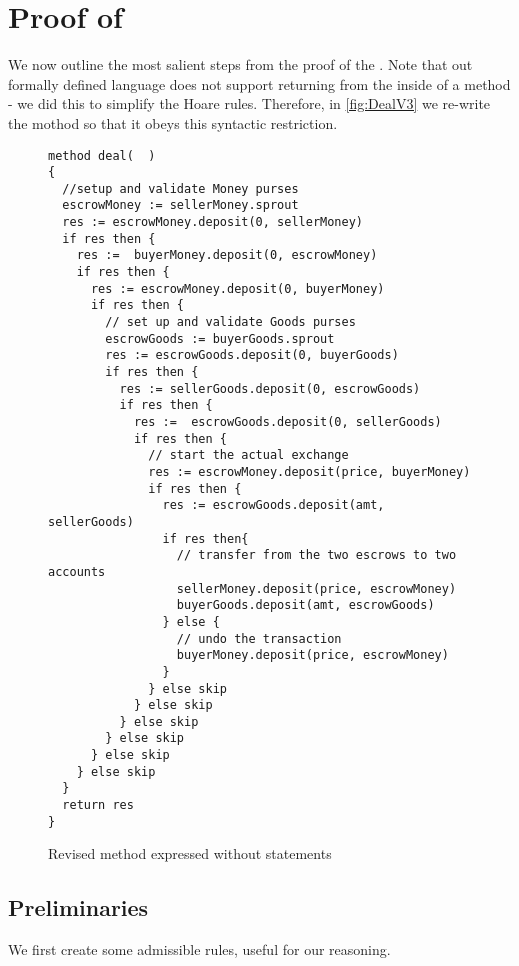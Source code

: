 \section{Proof of }


We now outline the most salient steps from the proof of the . Note that out formally defined language does not support returning from the inside of a method - we did this to simplify the Hoare rules. Therefore, in \autoref{fig:DealV3} we re-write the mothod  so that it obeys this  syntactic restriction.

\begin{figure*}[htb]
\begin{lstlisting}
method deal(  )  
{
  //setup and validate Money purses
  escrowMoney := sellerMoney.sprout
  res := escrowMoney.deposit(0, sellerMoney)
  if res then {
    res :=  buyerMoney.deposit(0, escrowMoney)
    if res then {
      res := escrowMoney.deposit(0, buyerMoney)     
      if res then {
        // set up and validate Goods purses
        escrowGoods := buyerGoods.sprout
        res := escrowGoods.deposit(0, buyerGoods) 
        if res then {
          res := sellerGoods.deposit(0, escrowGoods) 
          if res then {
            res :=  escrowGoods.deposit(0, sellerGoods) 
            if res then {
              // start the actual exchange
              res := escrowMoney.deposit(price, buyerMoney)
              if res then {
                res := escrowGoods.deposit(amt, sellerGoods)
                if res then{
                  // transfer from the two escrows to two accounts
                  sellerMoney.deposit(price, escrowMoney)
                  buyerGoods.deposit(amt, escrowGoods)
                } else {
                  // undo the transaction
                  buyerMoney.deposit(price, escrowMoney)
                }
              } else skip                        
            } else skip
          } else skip 
        } else skip 
      } else skip
    } else skip 
  }
  return res  
}  
\end{lstlisting}
\caption{Revised  method expressed without {} statements}
\label{fig:DealV3}
\end{figure*}
\subsection{Preliminaries}

We first create some admissible rules, useful for our reasoning.

